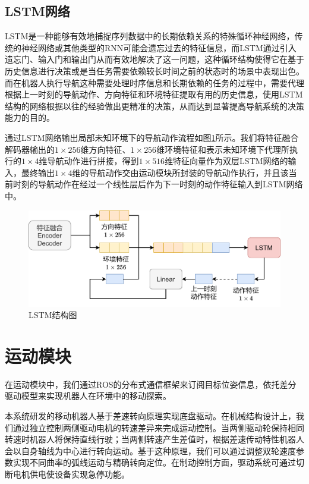 \subsection{LSTM网络}
LSTM是一种能够有效地捕捉序列数据中的长期依赖关系的特殊循环神经网络，传统的神经网络或其他类型的RNN可能会遗忘过去的特征信息，而LSTM通过引入遗忘门、输入门和输出门从而有效地解决了这一问题，这种循环结构使得它在基于历史信息进行决策或是当任务需要依赖较长时间之前的状态时的场景中表现出色。而在机器人执行导航这种需要处理时序信息和长期依赖的任务的过程中，需要代理根据上一时刻的导航动作、方向特征和环境特征提取有用的历史信息，使用LSTM结构的网络根据以往的经验做出更精准的决策，从而达到显著提高导航系统的决策能力的目的。

通过LSTM网络输出局部未知环境下的导航动作流程如图\ref{LSTM}所示。我们将特征融合解码器输出的$1 \times 256$维方向特征、$1 \times 256$维环境特征和表示未知环境下代理所执行的$1 \times 4$维导航动作进行拼接，得到$1 \times 516$维特征向量作为双层LSTM网络的输入，最终输出$1 \times 4$维的导航动作交由运动模块所封装的导航动作执行，并且该当前时刻的导航动作在经过一个线性层后作为下一时刻的动作特征输入到LSTM网络中。
\begin{figure}[htbp]
    \centering
    \includegraphics[scale=0.10]{Fig/LSTM.png}
    \caption{\label{LSTM}LSTM结构图}
\end{figure}


\section{运动模块}
在运动模块中，我们通过ROS的分布式通信框架来订阅目标位姿信息，依托差分驱动模型来实现机器人在环境中的移动探索。


本系统研发的移动机器人基于差速转向原理实现底盘驱动。在机械结构设计上，我们通过独立控制两侧驱动电机的转速差异来完成运动控制。当两侧驱动轮保持相同转速时机器人将保持直线行驶；当两侧转速产生差值时，根据差速传动特性机器人会以自身轴线为中心进行转向运动。基于这种原理，我们可以通过调整双轮速度参数实现不同曲率的弧线运动与精确转向定位。在制动控制方面，驱动系统可通过切断电机供电使设备实现急停功能。

